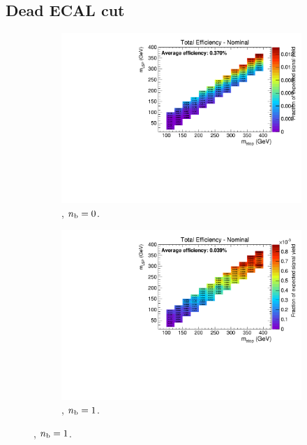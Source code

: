 \newpage
\subsection*{Dead ECAL cut}
\label{sec:t2degen_deadecal_plots}

\begin{figure}[h!]
  \centering
  \begin{subfigure}[b]{0.4\textwidth}
    \includegraphics[width=\textwidth, page=3]{Figs/sms/t2degen/v5/DeadECAL_T2_4body_v5_eq0b_le3j_incl.pdf}
    \caption{\njlow, $n_{\text{b}} = 0$.}
  \end{subfigure}
  \begin{subfigure}[b]{0.4\textwidth}
    \includegraphics[width=\textwidth, page=3]{Figs/sms/t2degen/v5/DeadECAL_T2_4body_v5_eq1b_le3j_incl.pdf}
    \caption{\njlow, $n_{\text{b}} = 1$.}

\end{subfigure}
\end{figure}
